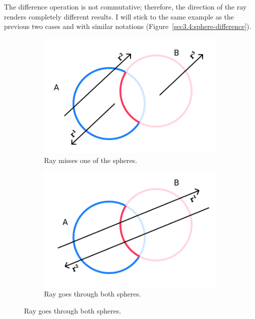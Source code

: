 \documentclass[a4paper,11pt,oneside]{article}
\begin{document}
The difference operation is not commutative; therefore, the direction of the ray renders completely different results. I will stick to the same example as the previous two cases and with similar notations (Figure~\ref{sec3.4:sphere-difference}).

\begin{figure}[H]
	\centering
	\begin{subfigure}[b]{0.3\textwidth}
		\centering
		\includegraphics[width=\textwidth]{section4/4.1/difference-case-1.png}
		\caption{Ray misses one of the spheres.}
		\label{sec3.4:difference-case-1}
	\end{subfigure}
	\hfill
	\begin{subfigure}[b]{0.3\textwidth}
		\centering
		\includegraphics[width=\textwidth]{section4/4.1/difference-case-2.png}
		\caption{Ray goes through both spheres.}
		\label{sec3.4:difference-case-2}
	\end{subfigure}	

\end{figure}
\end{document}
